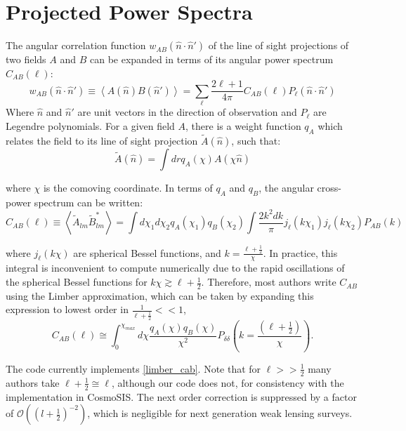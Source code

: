 \documentclass[a4paper,11pt]{article}
\begin{document}
\section{Projected Power Spectra}\label{projected_power}
The angular correlation function $w_{AB}(\hat{n}\cdot\hat{n}')$ of the line of sight projections of two fields $A$ and $B$ can be expanded in terms of its angular power spectrum $C_{AB}\left(\ell\right)$\cite{extended_limber}:
\begin{equation}
w_{AB}(\hat{n}\cdot\hat{n}')\equiv\left<A(\hat{n})B(\hat{n}')\right>=\sum_{\ell}{\frac{2\ell+1}{4\pi}C_{AB}(\ell)P_\ell(\hat{n}\cdot\hat{n}')}
\end{equation}
Where $\hat{n}$ and $\hat{n}'$ are unit vectors in the direction of observation and $P_\ell$ are  Legendre polynomials. For a given field $A$, there is a weight function $q_A$ which relates the field to its line of sight projection $\tilde{A}(\hat{n})$, such that\cite{extended_limber}:
\begin{equation}
\tilde{A}(\hat{n}) = \int{dr q_A(\chi)A(\chi\hat{n})}
\end{equation}

where $\chi$ is the comoving coordinate. In terms of $q_A$ and $q_B$, the angular cross-power spectrum can be written:
\begin{equation}\label{no limber}
C_{AB}(\ell)\equiv\left<\tilde{A}_{lm}\tilde{B}_{lm}^*\right>=\int{d\chi_1 d\chi_2 q_A(\chi_1)q_B(\chi_2)\int{\frac{2 k^2 dk}{\pi} j_\ell(k \chi_1)j_\ell(k \chi_2)P_{AB}(k)}}
\end{equation}

where $j_\ell(k\chi)$ are spherical Bessel functions, and $k=\frac{\ell+\frac{1}{2}}{\chi}$. In practice, this integral is inconvenient to compute numerically due to the rapid oscillations of the spherical Bessel functions for $k\chi\gtrsim \ell+\frac{1}{2}$. Therefore, most authors write $C_{AB}$ using the Limber approximation, which can be taken by expanding this expression to lowest order in $\frac{1}{\ell+\frac{1}{2}}<<1$,
\begin{equation}\label{limber_cab}
C_{AB}(\ell)\cong\int_{0}^{\chi_{max}}{d\chi \frac{q_A(\chi)q_B(\chi)}{\chi^2}P_{\delta\delta}\left(k=\frac{(\ell+\frac{1}{2})}{\chi}\right)}.
\end{equation}

The code currently implements \eqref{limber_cab}. Note that for $\ell>>\frac{1}{2}$ many authors take $\ell+\frac{1}{2}\cong\ell$, although our code does not, for consistency with the implementation in CosmoSIS\cite{cosmosis}. The next order correction is suppressed by a factor of $\mathcal{O}((l+\frac{1}{2})^{-2})$, which is negligible for next generation weak lensing surveys. 
\end{document}
